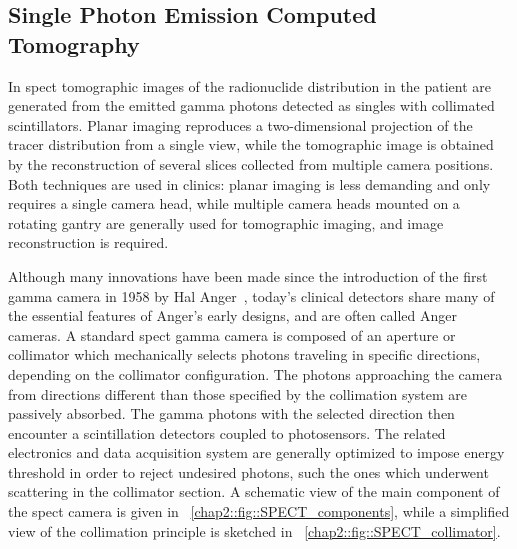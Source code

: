 \subsection{Single Photon Emission Computed Tomography}\label{chap2::subsec::SPECT_NM}
In \gls{spect} tomographic images of the radionuclide distribution in the patient are generated from the emitted gamma photons detected as singles with collimated scintillators. Planar imaging reproduces a two-dimensional projection of the tracer distribution from a single view, while the tomographic image is obtained by the reconstruction of several slices collected from multiple camera positions. Both techniques are used in clinics: planar imaging is less demanding and only requires a single camera head, while multiple camera heads mounted on a rotating gantry are generally used for tomographic imaging, and image reconstruction is required.

Although many innovations have been made since the introduction of the first gamma camera in 1958 by Hal Anger~\parencite{Anger1958}, today's clinical detectors share many of the essential features of Anger's early designs, and are often called Anger cameras. A standard \gls{spect} gamma camera is composed of an aperture or collimator which mechanically selects photons traveling in specific directions, depending on the collimator configuration. The photons approaching the camera from directions different than those specified by the collimation system are passively absorbed. The gamma photons with the selected direction then encounter a scintillation detectors coupled to photosensors. The related electronics and data acquisition system are generally optimized to impose energy threshold in order to reject undesired photons, such the ones which underwent scattering in the collimator section. A schematic view of the main component of the \gls{spect} camera is given in \figurename~\ref{chap2::fig::SPECT_components}, while a simplified view of the collimation principle is sketched in \figurename~\ref{chap2::fig::SPECT_collimator}.   

